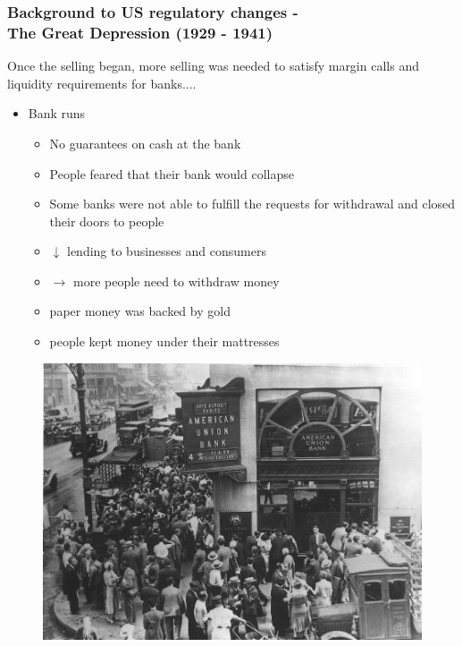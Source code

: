 \documentclass[11pt]{beamer}
\begin{document}
\begin{frame}
\frametitle{Background to US regulatory changes - \\ The Great Depression (1929 - 1941)}
Once the selling began, more selling was needed to satisfy margin calls and liquidity requirements for banks....
\\

\begin{itemize}
\item Bank runs
\begin{itemize}
\item No guarantees on cash at the bank
\item People feared that their bank would collapse
\item Some banks were not able to fulfill the requests for withdrawal and closed their doors to people
\item $\downarrow$ lending to businesses and consumers
\item $\rightarrow$ more people need to withdraw money
\item paper money was backed by gold
\item people kept money under their mattresses
\end{itemize}

\end{itemize}

\end{frame}
\begin{frame}
\begin{figure}
\includegraphics[width=1\textwidth]{Figures/Bankrun.png}
\end{figure}
\end{frame}
\end{document}
